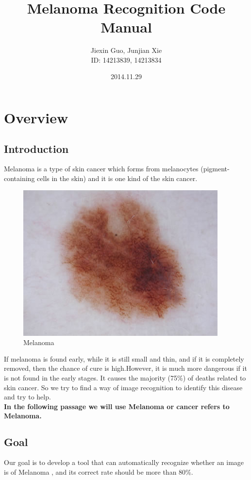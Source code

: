 \documentclass[14pt]{report} %
\title{Melanoma Recognition Code Manual}
\author{Jiexin Guo, Junjian Xie \\ID:	14213839,	14213834}
\date{2014.11.29}
\begin{document}
\maketitle
\clearpage

\tableofcontents
\clearpage

\chapter{Overview}
\clearpage
\section{Introduction}
	Melanoma is a type of skin cancer which forms from melanocytes (pigment-containing cells in the skin) and it is one kind of the skin cancer. 
	\begin{figure}[H]\includegraphics[width=\textwidth]{../dataset/cancer/pic_006.jpg} \caption{Melanoma}  \label{fig:introCancerImg} \end{figure}
	If melanoma is found early, while it is still small and thin, and if it is completely removed, then the chance of cure is high.However, it is much more dangerous if it is not found in the early stages. It causes the majority (75\%) of deaths related to skin cancer.
	So we try to find a way of image recognition to identify this disease and try to help.
	\\ \textbf{In the following passage we will use Melanoma or cancer refers to Melanoma.}
\section{Goal}
	Our goal is to develop a tool that can automatically recognize whether an image is of Melanoma , and its correct rate should be more than 80\%.
\end{document}
